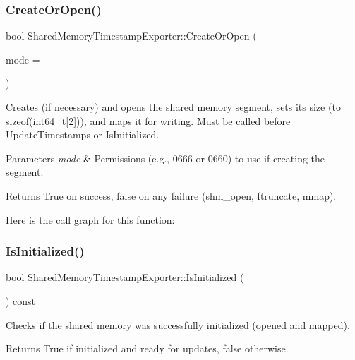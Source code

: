 \subsubsection{\texorpdfstring{Create\+Or\+Open()}{CreateOrOpen()}}
{\footnotesize\ttfamily bool Shared\+Memory\+Timestamp\+Exporter\+::\+Create\+Or\+Open (\begin{DoxyParamCaption}\item[{mode\+\_\+t}]{mode = {} }\end{DoxyParamCaption})}



Creates (if necessary) and opens the shared memory segment, sets its size (to sizeof(int64\+\_\+t\mbox{[}2\mbox{]})), and maps it for writing. Must be called before Update\+Timestamps or Is\+Initialized. 


\begin{DoxyParams}{Parameters}
{\em mode} & Permissions (e.\+g., 0666 or 0660) to use if creating the segment. \\
\hline
\end{DoxyParams}
\begin{DoxyReturn}{Returns}
True on success, false on any failure (shm\+\_\+open, ftruncate, mmap). 
\end{DoxyReturn}
Here is the call graph for this function\+:
\mbox{\label{classEventDetect_1_1SharedMemoryTimestampExporter_a3e058d7e830a8ae6bb59dfa7a7673a5c}} 
\subsubsection{\texorpdfstring{Is\+Initialized()}{IsInitialized()}}
{\footnotesize\ttfamily bool Shared\+Memory\+Timestamp\+Exporter\+::\+Is\+Initialized (\begin{DoxyParamCaption}{ }\end{DoxyParamCaption}) const}



Checks if the shared memory was successfully initialized (opened and mapped). 

\begin{DoxyReturn}{Returns}
True if initialized and ready for updates, false otherwise. 
\end{DoxyReturn}
\mbox{\label{classEventDetect_1_1SharedMemoryTimestampExporter_a7aab6c44488a85d6272606b2f733f2bc}} 
